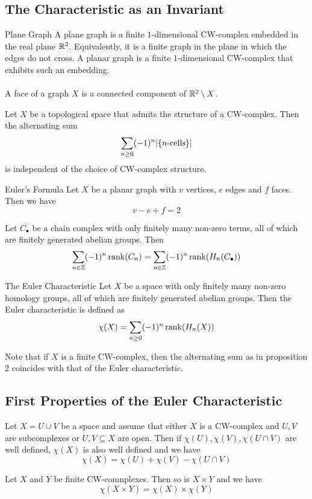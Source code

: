 \documentclass[a4paper]{article}
\begin{document}
\subsection{The Characteristic as an Invariant}
\begin{defn}{Plane Graph}{} A plane graph is a finite $1$-dimensional CW-complex embedded in the real plane $\mathbb{R}^2$. Equivalently, it is a finite graph in the plane in which the edges do not cross. A planar graph is a finite $1$-dimensional CW-complex that exhibits such an embedding. \\~\\

A face of a graph $X$ is a connected component of $\mathbb{R}^2\setminus X$. 
\end{defn}

\begin{prp}{}{} Let $X$ be a topological space that admits the structure of a CW-complex. Then the alternating sum $$\sum_{n\geq 0}(-1)^n\abs{\{n\text{-cells}\}}$$ is independent of the choice of CW-complex structure. 
\end{prp}

\begin{prp}{Euler's Formula}{} Let $X$ be a planar graph with $v$ vertices, $e$ edges and $f$ faces. Then we have $$v-e+f=2$$
\end{prp}

\begin{crl}{}{} Let $C_\bullet$ be a chain complex with only finitely many non-zero terms, all of which are finitely generated abelian groups. Then $$\sum_{n\in\mathbb{Z}}(-1)^n\rank(C_n)=\sum_{n\in\mathbb{Z}}(-1)^n\rank(H_n(C_\bullet))$$
\end{crl}

\begin{defn}{The Euler Characteristic}{} Let $X$ be a space with only finitely many non-zero homology groups, all of which are finitely generated abelian groups. Then the Euler characteristic is defined as $$\chi(X)=\sum_{n\geq 0}(-1)^n\rank(H_n(X))$$
\end{defn}

Note that if $X$ is a finite CW-complex, then the alternating sum as in proposition 2 coincides with that of the Euler characteristic. 

\subsection{First Properties of the Euler Characteristic}
\begin{prp}{}{} Let $X=U\cup V$ be a space and assume that either $X$ is a CW-complex and $U,V$ are subcomplexes or $U,V\subseteq X$ are open. Then if $\chi(U),\chi(V),\chi(U\cap V)$ are well defined, $\chi(X)$ is also well defined and we have $$\chi(X)=\chi(U)+\chi(V)-\chi(U\cap V)$$
\end{prp}

\begin{prp}{}{} Let $X$ and $Y$ be finite CW-comnplexes. Then so is $X\times Y$ and we have $$\chi(X\times Y)=\chi(X)\times\chi(Y)$$
\end{prp}
\end{document}
